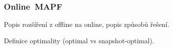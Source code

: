 %
%
%
%

\subsubsection{Online~MAPF}\label{subsubsec:online_mapf}

Popis rozšíření z offline na online, popis způsobů řešení.

Definice optimality (optimal vs snapshot-optimal).

